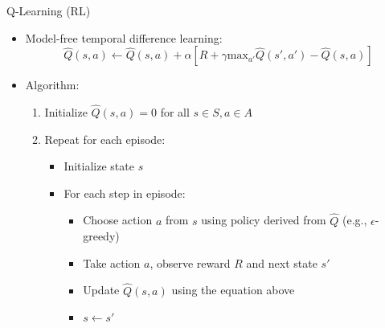 \documentclass[10pt]{beamer}
\renewcommand{\max}{\text{max}}
\begin{document}

\begin{frame}{Q-Learning (RL)}
    \begin{itemize}
        \item Model-free temporal difference learning:
        \begin{equation}
            \hat{Q}(s,a) \leftarrow \hat{Q}(s,a) + \alpha \left[ R + \gamma \max_{a'} \hat{Q}(s',a') - \hat{Q}(s,a) \right]
        \end{equation}
        
        \item Algorithm:
        \begin{enumerate}
            \item Initialize $\hat{Q}(s,a) = 0$ for all $s \in S, a \in A$
            \item Repeat for each episode:
            \begin{itemize}
                \item Initialize state $s$
                \item For each step in episode:
                \begin{itemize}
                    \item Choose action $a$ from $s$ using policy derived from $\hat{Q}$ (e.g., $\epsilon$-greedy)
                    \item Take action $a$, observe reward $R$ and next state $s'$
                    \item Update $\hat{Q}(s,a)$ using the equation above
                    \item $s \leftarrow s'$
                \end{itemize}
            \end{itemize}
        \end{enumerate}
    \end{itemize}
\end{frame}
\end{document}

